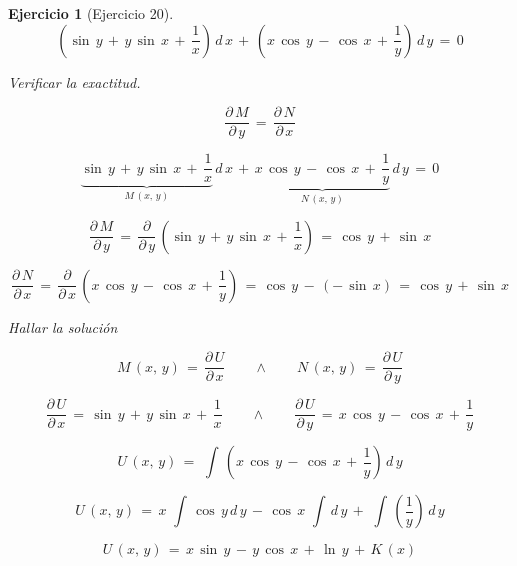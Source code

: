 \documentclass[a4paper,11pt]{book}
\newtheorem{ejer}{Ejercicio}[section]
\begin{document}
\begin{ejer}[Ejercicio 20] 

  $$\left(\sin\,y\,+\,y\,\sin\,x\,+\,\dfrac{1}{x} \right)\,d\,x\,+\,\left(x\,\cos\,y\,-\,\cos\,x\,+\,\dfrac{1}{y} \right)\,d\,y\,=\,0$$ 

  



  
 Verificar la exactitud. 

  

$$\dfrac{\partial\,M}{\partial\,y}\,=\,\dfrac{\partial\,N}{\partial\,x}$$ 

  

$$\underbrace{\sin\,y\,+\,y\,\sin\,x\,+\,\dfrac{1}{x}}_{M\,(x,\,y)} \,d\,x\,+\,\underbrace{x\,\cos\,y\,-\,\cos\,x\,+\,\dfrac{1}{y}}_{N\,(x,\,y)}\,d\,y\,=\,0$$ 

  

$$\dfrac{\partial\,M}{\partial\,y}\,=\,\dfrac{\partial}{\partial\,y}\,\left(\sin\,y\,+\,y\,\sin\,x\,+\,\dfrac{1}{x} \right)\,=\,\boxed{\cos\,y\,+\,\sin\,x}$$ 

  

$$\dfrac{\partial\,N}{\partial\,x}\,=\,\dfrac{\partial}{\partial\,x}\,\left(x\,\cos\,y\,-\,\cos\,x\,+\,\dfrac{1}{y} \right)\,=\,\cos\,y\,-\,(-\,\sin\,x)\,=\,\boxed{\cos\,y\,+\,\sin\,x}$$ 

  

 Hallar la solución 

  

$$\boxed{M\,(x,\,y)\,=\,\dfrac{\partial\,U}{\partial\,x}} \qquad \wedge \qquad \boxed{N\,(x,\,y)\,=\,\dfrac{\partial\,U}{\partial\,y}}$$ 

  

$$\boxed{\dfrac{\partial\,U}{\partial\,x}\,=\,\sin\,y\,+\,y\,\sin\,x\,+\,\dfrac{1}{x} } \qquad \wedge \qquad \boxed{\dfrac{\partial\,U}{\partial\,y}\,=\,x\,\cos\,y\,-\,\cos\,x\,+\,\dfrac{1}{y} }$$ 

  

$$U\,(x,\,y)\,=\,\displaystyle\,\int\,\left(x\,\cos\,y\,-\,\cos\,x\,+\,\dfrac{1}{y} \right)\,d\,y$$ 

  

$$U\,(x,\,y)\,=\,x\,\displaystyle\,\int\,\cos\,y\,d\,y\,-\,\cos\,x\,\displaystyle\,\int\,d\,y\,+\,\displaystyle\,\int\,\left(\dfrac{1}{y} \right)\,d\,y$$ 

  

$$\boxed{U\,(x,\,y)\,=\,x\,\sin\,y\,-\,y\,\cos\,x\,+\,\ln\,y\,+\,K\,(x)}$$ 

  


\end{ejer}
\end{document}
